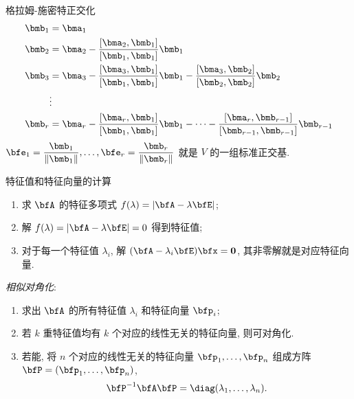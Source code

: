 \documentclass[aspectratio=169,handout]{ctexbeamer}
\begin{document}
\begin{frame}{格拉姆-施密特正交化}
	\begin{align*}
		\bmb_1&=\bma_1\\
		\bmb_2&=\bma_2-\frac{[\bma_2,\bmb_1]}{[\bmb_1,\bmb_1]}\bmb_1\\
		\bmb_3&=\bma_3-\frac{[\bma_3,\bmb_1]}{[\bmb_1,\bmb_1]}\bmb_1-\frac{[\bma_3,\bmb_2]}{[\bmb_2,\bmb_2]}\bmb_2\\
		&\vdots\\
		\bmb_r&=\bma_r-\frac{[\bma_r,\bmb_1]}{[\bmb_1,\bmb_1]}\bmb_1-\cdots-\frac{[\bma_r,\bmb_{r-1}]}{[\bmb_{r-1},\bmb_{r-1}]}\bmb_{r-1}
	\end{align*}
	 $\bfe_1=\dfrac{\bmb_1}{\|\bmb_1\|},\dots,\bfe_r=\dfrac{\bmb_r}{\|\bmb_r\|}$ 就是 $V$ 的一组标准正交基.
\end{frame}


\begin{frame}{特征值和特征向量的计算}
	\onslide<+->
	\begin{enumerate}
		\item 求 $\bfA$ 的特征多项式 $f(\lambda)=|\bfA-\lambda \bfE|$;
		\item 解 $f(\lambda)=|\bfA-\lambda \bfE|=0$ 得到特征值;
		\item 对于每一个特征值 $\lambda_i$, 解 $(\bfA-\lambda_i\bfE)\bfx={\bf0}$, 其\alert{非零解}就是对应特征向量.
	\end{enumerate}
	\onslide<+->
	\emph{相似对角化}:
	\begin{enumerate}
		\item 求出 $\bfA$ 的所有特征值 $\lambda_i$ 和特征向量 $\bfp_i$;
		\item 若 $k$ 重特征值均有 $k$ 个对应的线性无关的特征向量, 则可对角化.
		\item 若能, 将 $n$ 个对应的线性无关的特征向量 $\bfp_1,\dots,\bfp_n$ 组成方阵 $\bfP=(\bfp_1,\dots,\bfp_n)$, 
		\[\bfP^{-1}\bfA\bfP=\diag(\lambda_1,\dots,\lambda_n).\]
	\end{enumerate}
\end{frame}
\end{document}
